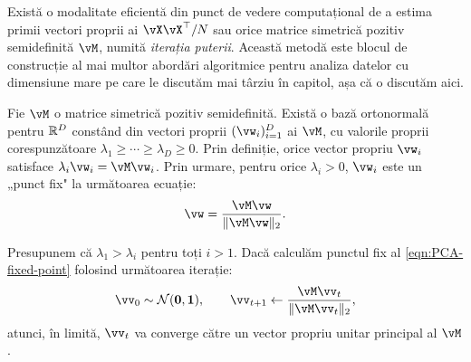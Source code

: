 \documentclass[../../book-main_ro.tex]{subfiles}
\begin{document}
Există o modalitate eficientă din punct de vedere computațional de a estima primii vectori proprii ai \(\vX\vX^{\top}/N\) sau orice matrice simetrică pozitiv semidefinită \(\vM\), numită \textit{iterația puterii}. Această metodă este blocul de construcție al mai multor abordări algoritmice pentru analiza datelor cu dimensiune mare pe care le discutăm mai târziu în capitol, așa că o discutăm aici.

Fie \(\vM\) o matrice simetrică pozitiv semidefinită. Există o bază ortonormală pentru \(\mathbb{R}^{D}\) constând din vectori proprii \((\vw_{i})_{i = 1}^{D}\) ai \(\vM\), cu valorile proprii corespunzătoare \(\lambda_{1} \geq \cdots \geq \lambda_{D} \geq 0\). Prin definiție, orice vector propriu $\vw_i$ satisface $\lambda_i \vw_i = \vM \vw_i$. Prin urmare, pentru orice $\lambda_i > 0$, $\vw_i$ este un „punct fix" la următoarea ecuație:
\begin{equation}
    \vw = \frac{\vM\vw}{\norm{\vM\vw}_{2}}.
    \label{eqn:PCA-fixed-point}
\end{equation}

\begin{theorem}
Presupunem că \(\lambda_{1} > \lambda_{i}\) pentru toți \(i > 1\). Dacă calculăm punctul fix al \eqref{eqn:PCA-fixed-point} folosind următoarea iterație:
\begin{equation}\label{eq:power_iteration}
    \vv_{0} \sim \dNorm(\vzero, \vone), \qquad \vv_{t + 1} \gets \frac{\vM\vv_{t}}{\norm{\vM\vv_{t}}_{2}},
\end{equation}
atunci, în limită, \(\vv_{t}\) va converge către un vector propriu unitar principal al \(\vM\).
\end{theorem}
\end{document}
